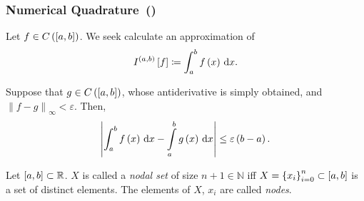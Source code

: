 \begin{frame}
    \frametitle{
        Numerical Quadrature~(\citeauthor[p.~397]{salgado_classical_2022})
    } %

    Let
    \begin{math}
        f\in
        C\left(\left[a,b\right]\right)
    \end{math}.
    We seek calculate an approximation of
    \begin{equation*}
        I^{\left(a,b\right)}
        \left[f\right]\coloneqq
        \int_{a}^{b}
        f\left(x\right)
        \dl x.
    \end{equation*}

    Suppose that
    \begin{math}
        g\in
        C\left(\left[a,b\right]\right)
    \end{math},
    whose antiderivative is simply obtained, and
    \begin{math}
        {\left\|f-g\right\|}_{\infty}<
        \varepsilon
    \end{math}.
    Then,
    \begin{equation*}
        \left|
        \int_{a}^{b}
        f\left(x\right)
        \dl x-
        \int\limits_{a}^{b}
        g\left(x\right)
        \dl x
        \right|\leq
        \varepsilon
        \left(b-a\right).
    \end{equation*}

    \begin{definition}
        Let
        \begin{math}
            \left[a,b\right]\subset
            \mathbb{R}
        \end{math}.
        $X$ is called a \emph{nodal set} of size $n+1\in\mathbb{N}$
        iff
        \begin{math}
            X={\left\{x_{i}\right\}}_{i=0}^{n}\subset
            \left[a,b\right]
        \end{math}
        is a set of distinct elements.
        The elements of $X$, $x_{i}$ are called \emph{nodes}.
    \end{definition}


\end{frame}
